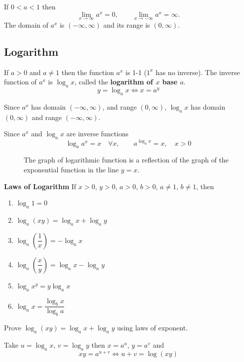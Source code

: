 \documentclass[../main.tex]{subfiles}
\begin{document}
  If $0<a<1$ then
  \[
    \lim_{x \to \infty} a^x = 0, \qquad
    \lim_{x \to -\infty} a^x = \infty.
  \]
  The domain of $a^x$ is $(-\infty, \infty)$ and its range is $(0, \infty)$.
  \begin{figure}[H]
    \centering
    
  \end{figure}

  \subsection*{Logarithm}

  If $a >0$ and $a \neq 1$ then the function $a^x$ is 1-1 ($1^x$ has no inverse). The inverse function of $a^x$ is $\log_a x$, called the \textbf{logarithm of $x$ base $a$}.
  \[
    y = \log_a x \iff x = a^y
  \]

  Since $a^x$ has domain $(-\infty, \infty)$, and range $(0, \infty)$, $\log_a x$ has domain $(0, \infty)$ and range $(-\infty, \infty)$.

  Since $a^x$ and $\log_a x$ are inverse functions
  \[
    \log_a a^x = x \quad \forall x, \qquad a^{\log_a x} = x, \quad x>0
  \]

  \begin{figure}[H]
    \centering
    
    \caption{The graph of logarithmic function is a reflection of the graph of the exponential function in the line $y = x$.}
  \end{figure}

  \textbf{Laws of Logarithm}
  If $x>0$, $y>0$, $a>0$, $b>0$, $a \neq 1$, $b \neq 1$, then

  \begin{multicols}{2}
    \begin{enumerate}
      \item $\log_a 1 = 0$
      \item $\log_a (x y) = \log_a x + \log_a y$
      \item $\log_a (\dfrac{1}{x}) = - \log_a x$
      \item $\log_a (\dfrac{x}{y}) = \log_a x - \log_a y$
      \item $\log_a x^y = y \log_a x$
      \item $\log_a x = \dfrac{\log_b x}{\log_b a}$
    \end{enumerate}
  \end{multicols}

  \begin{example}
    Prove $\log_a (x y) = \log_a x + \log_a y$ using laws of exponent.
  \end{example}
  \begin{solution}
    Take $u = \log_a x$, $v = \log_a y$ then $x = a^u$, $y = a^v$ and
    \[
      x y = a^{u+v} \iff u + v = \log(xy)
    \]
  \end{solution}
\end{document}
